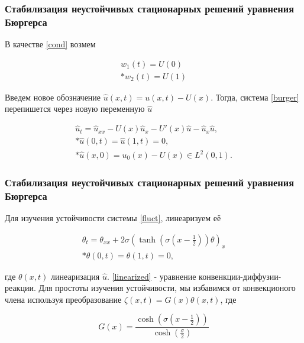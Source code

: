 \documentclass{beamer}
\begin{document}
\begin{frame}
\frametitle{Стабилизация неустойчивых стационарных решений уравнения Бюргерса}
В качестве \eqref{cond} возмем

\begin{block}{}
\begin{gather}\label{cond2}
  w_1(t) = U(0) \\*
  w_2(t) = U(1)
\end{gather}
\end{block}

Введем новое обозначение $\hat{u}(x, t) = u(x, t) - U(x)$. Тогда, система \eqref{burger} перепишется через новую переменную $\hat{u}$

\begin{block}{}
\begin{gather}\label{fluct}
    \hat{u}_t = \hat{u}_{xx} - U(x)\hat{u}_x - U'(x)\hat{u} - \hat{u}_x\hat{u}, \\*
    \hat{u}(0, t) = \hat{u}(1, t) = 0, \\*
    \hat{u}(x, 0) = u_{0}(x) - U(x) \in L^2(0, 1).
\end{gather}
\end{block}

\end{frame}

\begin{frame}
\frametitle{Стабилизация неустойчивых стационарных решений уравнения Бюргерса}

Для изучения устойчивости системы \eqref{fluct}, линеаризуем её

\begin{block}{}
\begin{gather}\label{linearized}
  \theta_t = \theta_{xx} + 2 \sigma (\tanh(\sigma(x - \frac{1}{2}))\theta)_x \\*
  \theta(0, t) = \theta(1, t) = 0,
\end{gather}
\end{block}

где $\theta(x, t)$ линеаризация $\hat{u}$. \eqref{linearized} - уравнение конвенкции-диффузии-реакции. Для простоты изучения устойчивости, мы избавимся от конвекционого члена используя преобразование $\zeta(x, t) = G(x)\theta(x, t)$, где 

\begin{block}{}
\begin{equation}
  G(x) = \frac{\cosh(\sigma(x - \frac{1}{2}))}{\cosh(\frac{\sigma}{2})}
\end{equation} 
\end{block}

\end{frame}
\end{document}
